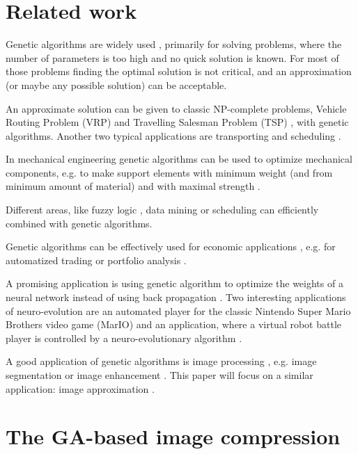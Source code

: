 \documentclass[conference]{IEEEtran}
\begin{document}
\section{Related work}

Genetic algorithms \cite{ga-book} are widely used \cite{such2017}, primarily for solving problems, where
the number of parameters is  too high and no quick solution is known. For
most of those problems finding the optimal solution is not critical, and
an approximation (or maybe any possible solution) can be acceptable.

An approximate solution can be given to classic NP-complete problems,
Vehicle Routing Problem (VRP) \cite{ga-vrp} and Travelling Salesman Problem (TSP) \cite{ga-tsp},
with genetic algorithms. Another two typical applications are transporting \cite{ga-transport}
and scheduling \cite{ga-scheduling}.

In mechanical engineering genetic algorithms can be used to optimize mechanical
components, e.g. to make support elements with minimum weight (and from
minimum amount of material) and with maximal strength \cite{bhoskar2015}.

Different areas, like fuzzy logic \cite{buckley1994}, data mining \cite{barman2017} or
scheduling \cite{gonccalves2005} can efficiently combined with genetic algorithms.

Genetic algorithms can be effectively used for economic applications \cite{dawid1998},
e.g. for automatized trading \cite{ga-trading} or portfolio analysis \cite{ga-portfolio}.

A promising application is using genetic algorithm to optimize the
weights of a neural network instead of using back propagation \cite{hecht1992, such2017}.
Two interesting applications of neuro-evolution are an automated player
for the classic Nintendo Super Mario Brothers video game (MarIO) \cite{mar-io}
and an application, where a virtual robot battle player is controlled by a
neuro-evolutionary algorithm \cite{ga-robocode}.

A good application of genetic algorithms is image processing \cite{image-proc}, e.g.
image segmentation \cite{ga-imgseg} or image enhancement \cite{ga-imgenh}. This paper
will focus on a similar application: image approximation \cite{vakulya2021}.

\section{The GA-based image compression}
\end{document}

